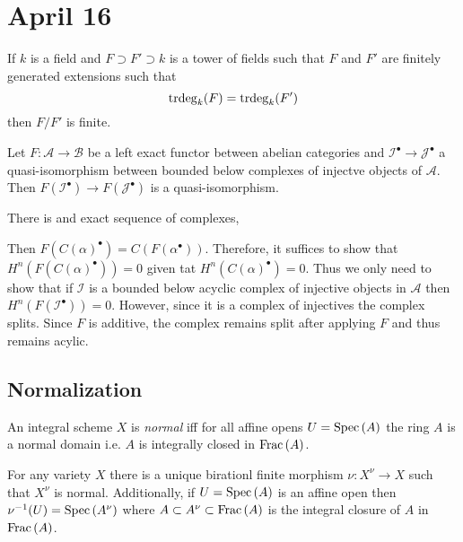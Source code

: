 \documentclass[12pt]{article}
\begin{document}
\section{April 16}

\begin{lemma}
If $k$ is a field and $F \supset F' \supset k$ is a tower of fields such that $F$ and $F'$ are finitely generated extensions such that 
\[ \mathrm{trdeg}_{k}(F) = \mathrm{trdeg}_{k}(F') \]
then $F / F'$ is finite. 
\end{lemma}

\begin{theorem}
Let $F : \mathcal{A} \to \mathcal{B}$ be a left exact functor between abelian categories and $\mathcal{I}^\bullet \to \mathcal{J}^\bullet$ a quasi-isomorphism between bounded below complexes of injectve objects of $\mathcal{A}$. Then $F(\mathcal{I}^\bullet) \to F(\mathcal{J}^\bullet)$ is a quasi-isomorphism.
\end{theorem}

\begin{theorem}
There is and exact sequence of complexes,
\begin{center}
\end{center}
Then $F(C(\alpha)^\bullet) = C(F(\alpha^\bullet))$. Therefore, it suffices to show that $H^n(F(C(\alpha)^\bullet)) = 0$ given tat $H^n(C(\alpha)^\bullet) = 0$. Thus we only need to show that if $\mathcal{I}$ is a bounded below acyclic complex of injective objects in $\mathcal{A}$ then $H^n(F(\mathcal{I}^\bullet)) = 0$. However, since it is a complex of injectives the complex splits. Since $F$ is additive, the complex remains split after applying $F$ and thus remains acylic.  
\end{theorem}

\subsection{Normalization}

\begin{definition}
An integral scheme $X$ is \textit{normal} iff for all affine opens $U = \mathrm{Spec}\left( A \right)$ the ring $A$ is a normal domain i.e. $A$ is integrally closed in $\mathrm{Frac}\left(A\right)$. 
\end{definition}

\begin{proposition}
For any variety $X$ there is a unique birationl finite morphism $\nu : X^\nu \to X$ such that $X^\nu$ is normal. Additionally, if $U = \mathrm{Spec}\left( A \right)$ is an affine open then $\nu^{-1}(U) = \mathrm{Spec}\left( A^\nu \right)$ where $A \subset A^\nu \subset \mathrm{Frac}\left(A\right)$ is the integral closure of $A$ in $\mathrm{Frac}\left(A\right)$. 
\end{proposition}
\end{document}
